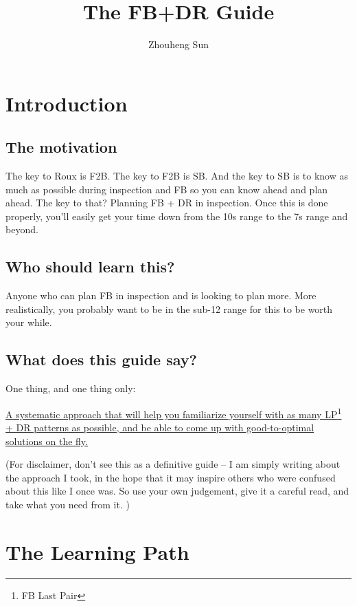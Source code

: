 \documentclass[12pt,letter]{article}
\title{The FB+DR Guide}
\author{Zhouheng Sun}
\date{}
\begin{document}
\maketitle

\section{Introduction}

\subsection*{The motivation}

The key to Roux is F2B. The key to F2B is SB. And the key to SB is to know as much as possible during inspection and FB so you can know ahead and plan ahead. The key to that? Planning FB + DR in inspection. Once this is done properly, you’ll easily get your time down from the 10s range to the 7s range and beyond. 

\subsection*{Who should learn this?}

Anyone who can plan FB in inspection and is looking to plan more. More realistically, you probably want to be in the sub-12 range for this to be worth your while.



\subsection*{What does this guide say?}

One thing, and one thing only:

\ul{A systematic approach that will help you familiarize yourself with as many LP\footnote{FB Last Pair} + DR patterns as possible, and be able to come up with good-to-optimal solutions on the fly.}

\vspace{12px}

(For disclaimer, don't see this as a definitive guide -- I am simply writing about the approach I took, in the hope that it may inspire others who were confused about this like I once was. So use your own judgement, give it a careful read, and take what you need from it. )

\section{The Learning Path}
\end{document}
